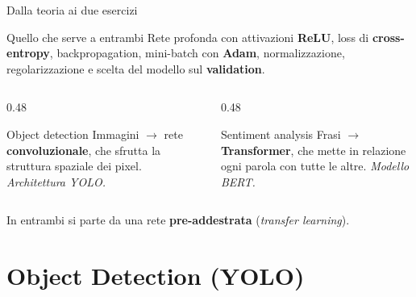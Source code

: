 \documentclass[aspectratio=169]{beamer}
\begin{document}
\begin{frame}{Dalla teoria ai due esercizi}
  \begin{block}{Quello che serve a entrambi}
    Rete profonda con attivazioni \textbf{ReLU}, loss di \textbf{cross-entropy},
    backpropagation, mini-batch con \textbf{Adam}, normalizzazione,
    regolarizzazione e scelta del modello sul \textbf{validation}.
  \end{block}
  \vspace{0.2cm}
  \begin{columns}[T]
    \begin{column}{0.48\textwidth}
      \begin{block}{Object detection}
        Immagini $\to$ rete \textbf{convoluzionale}, che sfrutta la struttura
        spaziale dei pixel. \emph{Architettura YOLO.}
      \end{block}
    \end{column}
    \begin{column}{0.48\textwidth}
      \begin{block}{Sentiment analysis}
        Frasi $\to$ \textbf{Transformer}, che mette in relazione ogni parola con
        tutte le altre. \emph{Modello BERT.}
      \end{block}
    \end{column}
  \end{columns}
  \vspace{0.2cm}
  \begin{center}
    \small In entrambi si parte da una rete \textbf{pre-addestrata}
    (\emph{transfer learning}).
  \end{center}
\end{frame}

\section{Object Detection (YOLO)}
\end{document}
